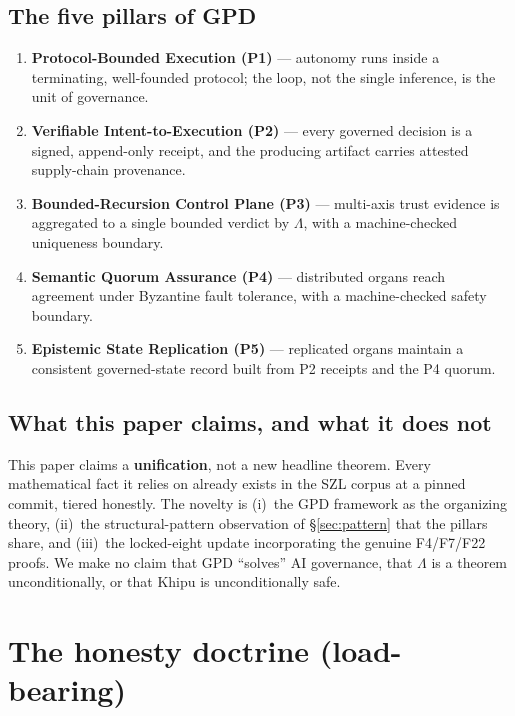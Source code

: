 \documentclass[11pt,letterpaper]{article}
\theoremstyle{definition}
\newcommand{\Lam}{\Lambda}
\begin{document}
\subsection{The five pillars of GPD}
\begin{enumerate}
\item \textbf{Protocol-Bounded Execution (P1)} --- autonomy runs inside a
terminating, well-founded protocol; the loop, not the single inference, is the
unit of governance.
\item \textbf{Verifiable Intent-to-Execution (P2)} --- every governed decision is
a signed, append-only receipt, and the producing artifact carries attested
supply-chain provenance.
\item \textbf{Bounded-Recursion Control Plane (P3)} --- multi-axis trust evidence
is aggregated to a single bounded verdict by $\Lam$, with a machine-checked
uniqueness boundary.
\item \textbf{Semantic Quorum Assurance (P4)} --- distributed organs reach
agreement under Byzantine fault tolerance, with a machine-checked safety
boundary.
\item \textbf{Epistemic State Replication (P5)} --- replicated organs maintain a
consistent governed-state record built from P2 receipts and the P4 quorum.
\end{enumerate}

\subsection{What this paper claims, and what it does not}
This paper claims a \textbf{unification}, not a new headline theorem. Every
mathematical fact it relies on already exists in the SZL corpus at a pinned
commit, tiered honestly. The novelty is (i)~the GPD framework as the organizing
theory, (ii)~the structural-pattern observation of \S\ref{sec:pattern} that the
pillars share, and (iii)~the locked-eight update incorporating the genuine
F4/F7/F22 proofs. We make no claim that GPD ``solves'' AI governance, that $\Lam$
is a theorem unconditionally, or that Khipu is unconditionally safe.

\section{The honesty doctrine (load-bearing)}\label{sec:doctrine}
\end{document}
